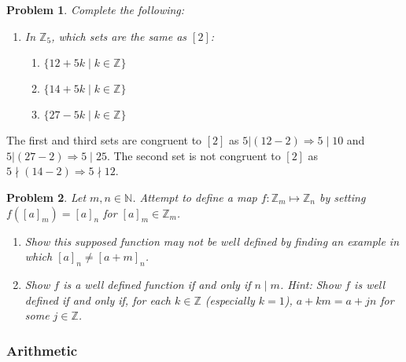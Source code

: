 \documentclass[12pt]{article}
\newtheorem{problem}{Problem}
\numberwithin{problem}{section} %
\theoremstyle{remark}  %
\newenvironment{answer}
    {\begin{adjustwidth}{0pt}{0pt}}
    {\end{adjustwidth}}
\begin{document}
    \setcounter{problem}{38}
    \begin{problem}
        Complete the following:
        \begin{enumerate}[label=(\alph*)]
            \item In $\mathbb{Z}_5$, which sets are the same as $[2]$:
            \begin{enumerate}[label=(\roman*)]
                \item $\{12+5k \mid k \in \mathbb{Z}\}$
                \item $\{14+5k \mid k \in \mathbb{Z}\}$
                \item $\{27-5k \mid k \in \mathbb{Z}\}$
            \end{enumerate}
        \end{enumerate}
    \end{problem}
    \begin{answer}
        The first and third sets are congruent to $[2]$ as $5|(12-2) \Rightarrow 5\mid 10$ and $5|(27-2) \Rightarrow 5\mid 25$. The second set is not congruent to $[2]$ as $5 \nmid (14-2) \Rightarrow 5 \nmid 12$.
    \end{answer}
\vspace{5pt}
    \setcounter{problem}{40}
    \begin{problem}
        Let $m,n\in\mathbb{N}$. Attempt to define a map $f\operatorname{:}\mathbb{Z}_m \mapsto \mathbb{Z}_n$ by setting $f([a]_m)=[a]_n$ for $[a]_m \in \mathbb{Z}_m$.
        \begin{enumerate}
            \item Show this supposed function may not be well defined by finding an example in which $[a]_n \neq [a+m]_n$.
            \item Show $f$ is a well defined function if and only if $n \mid m$. Hint: Show $f$ is well defined if and only if, for each $k \in \mathbb{Z}$ (especially $k=1$), $a+km=a+jn$ for some $j\in \mathbb{Z}$.
        \end{enumerate}
    \end{problem}

\subsubsection{Arithmetic}
\end{document}
